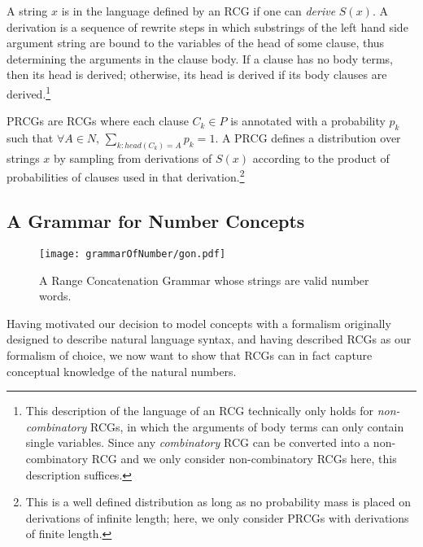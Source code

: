 \documentclass[10pt,letterpaper]{article}
\begin{document}
A string $x$ is in the language defined by an RCG if one can
\emph{derive} $S(x)$. A derivation is a sequence of rewrite steps in
which substrings of the left hand side argument string are bound to
the variables of the head of some clause, thus determining the
arguments in the clause body. If a clause has no body terms, then its
head is derived; otherwise, its head is derived if its body clauses
are derived.\footnote{This description of the language of an RCG
  technically only holds for \emph{non-combinatory} RCGs, in which the
  arguments of body terms can only contain single variables. Since any
  \emph{combinatory} RCG can be converted into a non-combinatory RCG
  and we only consider non-combinatory RCGs here, this description
  suffices.}

PRCGs are RCGs where each clause $C_k \in P$ is annotated with
a probability $p_k$ such that ${\forall A \in N, \,
  \sum_{k:head(C_k)=A} p_k = 1}$. A PRCG defines a distribution over
strings $x$ by sampling from derivations of $S(x)$ according to the
product of probabilities of clauses used in that derivation.\footnote{This is a
well defined distribution as long as no probability mass is placed on
derivations of infinite length; here, we only consider PRCGs with
derivations of finite length.}

\subsection{A Grammar for Number Concepts}

\begin{figure*}[t]
		\texttt{[image: grammarOfNumber/gon.pdf]}
		\caption{A Range Concatenation Grammar whose strings are valid number words.}
		\label{fig:gon}
\end{figure*}


Having motivated our decision to model concepts with a formalism
originally designed to describe natural language syntax, and having
described RCGs as our formalism of choice, we now want to show that
RCGs can in fact capture conceptual knowledge of the natural numbers.
\end{document}

